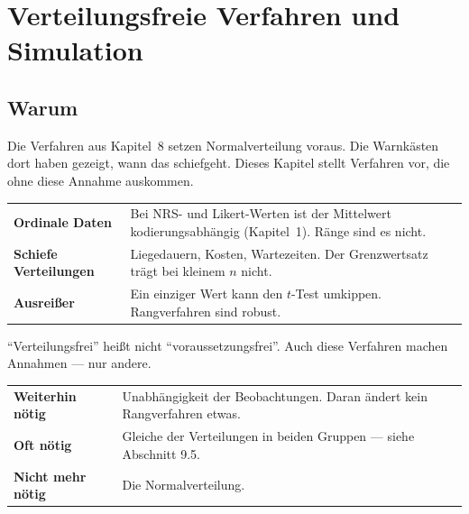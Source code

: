 \chapter{Verteilungsfreie Verfahren und Simulation}

\section{Warum}

Die Verfahren aus Kapitel~8 setzen Normal\-verteilung voraus. Die Warnkästen dort haben gezeigt, wann das schiefgeht. Dieses Kapitel stellt Verfahren vor, die ohne diese Annahme auskommen.

\begin{merksatz}
\begin{center}
\renewcommand{\arraystretch}{1.5}
\begin{tabular}{@{}P{2.6cm}P{6.0cm}@{}}
\toprule
\textbf{Ordinale Daten} & Bei NRS- und Likert-Werten ist der Mittelwert kodierungsabhängig (Kapitel~1). Ränge sind es nicht.\\
\textbf{Schiefe Verteilungen} & Liegedauern, Kosten, Wartezeiten. Der Grenzwertsatz trägt bei kleinem $n$ nicht.\\
\textbf{Ausreißer} & Ein einziger Wert kann den $t$-Test umkippen. Rangverfahren sind robust.\\
\bottomrule
\end{tabular}
\end{center}
\end{merksatz}

\begin{warnung}
\enquote{Verteilungsfrei} heißt nicht \enquote{voraussetzungsfrei}. Auch diese Verfahren machen Annahmen --- nur andere.

\begin{center}
\renewcommand{\arraystretch}{1.5}
\begin{tabular}{@{}P{2.4cm}P{6.2cm}@{}}
\toprule
\textbf{Weiterhin nötig} & Unabhängigkeit der Beobachtungen. Daran ändert kein Rangverfahren etwas.\\
\textbf{Oft nötig} & Gleiche  der Verteilungen in beiden Gruppen --- siehe Abschnitt 9.5.\\
\textbf{Nicht mehr nötig} & Die Normalverteilung.\\
\bottomrule
\end{tabular}
\end{center}
\end{warnung}

